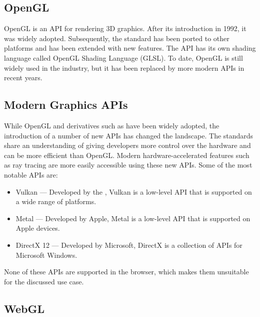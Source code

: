 \subsection*{OpenGL}

\gls{OpenGL} is an \gls{API} for rendering 3D graphics. After its introduction in 1992, it was widely adopted. Subsequently, the standard has been ported to other platforms and has been extended with new features. The \gls{API} has its own shading language called OpenGL Shading Language (\gls{GLSL}). To date, \gls{OpenGL} is still widely used in the industry, but it has been replaced by more modern \glspl{API} in recent years.

\subsection*{Modern Graphics APIs}

While \gls{OpenGL} and derivatives such as  have been widely adopted, the introduction of a number of new \glspl{API} has changed the landscape. The standards share an understanding of giving developers more control over the hardware and can be more efficient than \gls{OpenGL}. Modern hardware-accelerated features such as ray tracing are more easily accessible using these new \glspl{API}. Some of the most notable \glspl{API} are:

\begin{itemize}
  \item{\gls{Vulkan}} — Developed by the , \gls{Vulkan} is a low-level \gls{API} that is supported on a wide range of platforms.
  \item{\gls{Metal}} — Developed by Apple, \gls{Metal} is a low-level \gls{API} that is supported on Apple devices.
  \item{\gls{DirectX 12}} — Developed by Microsoft, DirectX is a collection of \glspl{API} for Microsoft Windows.
\end{itemize}

None of these \glspl{API} are supported in the browser, which makes them unsuitable for the discussed use case.

\subsection*{WebGL}

